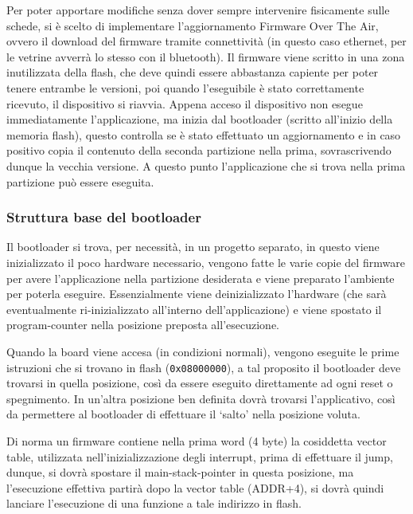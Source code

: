 Per poter apportare modifiche senza dover sempre intervenire fisicamente sulle schede, si \`e scelto di implementare l'aggiornamento Firmware Over The Air, ovvero il download del firmware tramite connettivit\`a (in questo caso ethernet, per le vetrine avverr\`a lo stesso con il bluetooth). Il firmware viene scritto in una zona inutilizzata della flash, che deve quindi essere abbastanza capiente per poter tenere entrambe le versioni, poi quando l'eseguibile \`e stato correttamente ricevuto, il dispositivo si riavvia. Appena acceso il dispositivo non esegue immediatamente l'applicazione, ma inizia dal bootloader (scritto all'inizio della memoria flash), questo controlla se \`e stato effettuato un aggiornamento e in caso positivo copia il contenuto della seconda partizione nella prima, sovrascrivendo dunque la vecchia versione. A questo punto l'applicazione che si trova nella prima partizione pu\`o essere eseguita.

\subsubsection{Struttura base del bootloader}

Il bootloader si trova, per necessit\`a, in un progetto separato, in questo viene inizializzato il poco hardware necessario, vengono fatte le varie copie del firmware per avere l'applicazione nella partizione desiderata e viene preparato l'ambiente per poterla eseguire. Essenzialmente viene deinizializzato l'hardware (che sar\`a eventualmente ri-inizializzato all'interno dell'applicazione) e viene spostato il program-counter nella posizione preposta all'esecuzione.

Quando la board viene accesa (in condizioni normali), vengono eseguite le prime istruzioni che si trovano in flash (\texttt{0x08000000}), a tal proposito il bootloader deve trovarsi in quella posizione, cos\`i da essere eseguito direttamente ad ogni reset o spegnimento. In un'altra posizione ben definita dovr\`a trovarsi l'applicativo, cos\`i da permettere al bootloader di effettuare il `salto' nella posizione voluta.

Di norma un firmware contiene nella prima word (4 byte) la cosiddetta vector table, utilizzata nell'inizializzazione degli interrupt, prima di effettuare il jump, dunque, si dovr\`a spostare il main-stack-pointer in questa posizione, ma l'esecuzione effettiva partir\`a dopo la vector table (ADDR+4), si dovr\`a quindi lanciare l'esecuzione di una funzione a tale indirizzo in flash.

